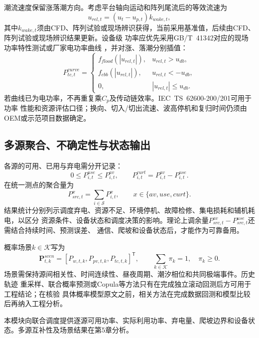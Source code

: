 潮流速度保留涨落潮方向。考虑平台轴向运动和阵列尾流后的等效流速为
\begin{equation}
u_{rel,t}=(u_t-u_{p,t})k_{wake,t},
\label{eq:tidal-relative}
\end{equation}
其中$k_{wake,t}$须由CFD、阵列试验或现场辨识获得，当前采用基准值，后续由CFD、阵列试验或现场辨识结果更新。设备级
功率应优先采用GB/T~41342对应的现场功率特性测试或厂家电功率曲线
\cite{gbt41342}，并对涨、落潮分别插值：
\begin{equation}
P_{tc,t}^{curve}=
\begin{cases}
f_{flood}(|u_{rel,t}|), & u_{rel,t}>u_{db},\\
f_{ebb}(|u_{rel,t}|), & u_{rel,t}<-u_{db},\\
0, & |u_{rel,t}|\le u_{db}.
\end{cases}
\label{eq:tidal-curve}
\end{equation}
若曲线已为电功率，不再重复乘$C_p$及传动链效率。IEC~TS~62600-200/201可用于功率
性能和资源评估口径\cite{iec62600}；换向、切入/切出流速、波高停机和复归时间仍须由
OEM或示范项目数据确定。

\subsection{多源聚合、不确定性与状态输出}

各源的可用、已用与弃电需分开记录：
\begin{equation}
0\le P_{i,t}^{use}\le P_{i,t}^{av},\qquad
P_{i,t}^{curt}=P_{i,t}^{av}-P_{i,t}^{use}.
\label{eq:source-use-curt}
\end{equation}
在统一测点的聚合量为
\begin{equation}
P_{src,t}^{x}=\sum_{i\in\mathcal S}P_{i,t}^{x},
\qquad x\in\{av,use,curt\}.
\label{eq:source-aggregate}
\end{equation}
结果统计分别列示调度弃电、资源不足、环境停机、故障检修、集电损耗和辅机耗电，以区分
资源条件、设备状态和调度决策的影响。理论上调余量$P_{src,t}^{av}-P_{src,t}^{use}$还需结合持续时间、预测误差、
通信、爬坡和设备状态后，才能作为可靠备用。

概率场景$k\in\mathcal K$写为
\begin{equation}
\bm P_{t,k}^{scen}=
[P_{w,t,k},P_{pv,t,k},P_{tc,t,k}]^{\mathsf T},\qquad
\sum_{k\in\mathcal K}\pi_k=1,\quad \pi_k\ge0.
\label{eq:joint-source-scenario}
\end{equation}
场景需保持源间相关性、时间连续性、昼夜周期、潮汐相位和共同极端事件。历史轨迹
重采样、联合概率预测或Copula等方法只有在完成独立滚动回测后方可用于工程结论；在核验
具体概率模型原文之前，相关方法在完成数据回测和模型比较后再纳入工程分析。

本模块向联合调度提供逐源可用功率、实际利用功率、弃电量、爬坡边界和设备状态。多源互补性及场景结果在第5章分析。
